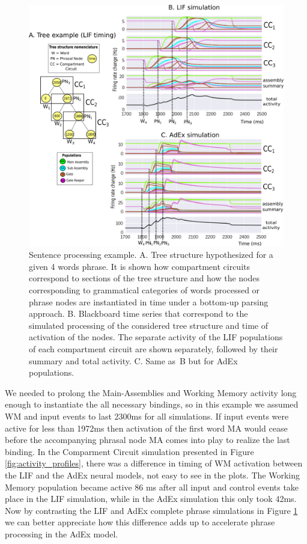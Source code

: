 \documentclass[10pt]{article}
\begin{document}
\begin{figure}[h!]
  \begin{center}
    \includegraphics[width=1.00\columnwidth]{figures/compartments_tree_example}
    \caption{Sentence processing example.
      A. Tree structure hypothesized for a given 4 words phrase.
      It is shown how compartment circuits correspond to sections of the tree structure and how the nodes corresponding to grammatical categories of words processed or phrase nodes are instantiated in time under a bottom-up parsing approach.
      B. Blackboard time series that correspond to the simulated processing of the considered tree structure and time of activation of the nodes.
      The separate activity of the LIF populations of each compartment circuit are shown separately, followed by their summary and total activity.
      C. Same as~B but for AdEx populations. {\label{fig:tree-example}}%
    }
  \end{center}
\end{figure}


We needed to prolong the Main-Assemblies and Working Memory activity long enough to instantiate the all necessary bindings, so in this example we assumed WM and input events to last 2300ms for all simulations.
If input events were active for less than 1972ms then activation of the first word MA would cease before the accompanying phrasal node MA comes into play to realize the last binding.
In the Comparment Circuit simulation presented in Figure \ref{fig:activity_profiles}, there was a difference in timing of WM activation between the LIF and the AdEx neural models, not easy to see in the plots.
The Working Memory population became active 86 ms after all input and control events take place in the LIF simulation, while in the AdEx simulation this only took 42ms.
Now by contrasting the LIF and AdEx complete phrase simulations in Figure \ref{fig:tree-example} we can better appreciate how this difference adds up to accelerate phrase processing in the AdEx model.
\end{document}

